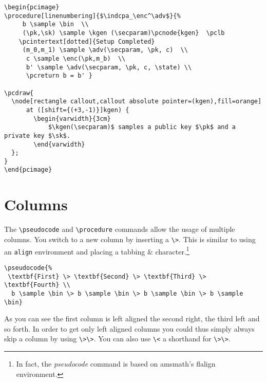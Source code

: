 \documentclass[a4paper]{report}
\begin{document}
\begin{lstlisting}
\begin{pcimage}
\procedure[linenumbering]{$\indcpa_\enc^\adv$}{%
	 b \sample \bin  \\
	 (\pk,\sk) \sample \kgen (\secparam)\pcnode{kgen}  \pclb
	\pcintertext[dotted]{Setup Completed} 
	 (m_0,m_1) \sample \adv(\secparam, \pk, c)  \\
	  c \sample \enc(\pk,m_b)  \\
	  b' \sample \adv(\secparam, \pk, c, \state) \\
	  \pcreturn b = b' }

\pcdraw{
  \node[rectangle callout,callout absolute pointer=(kgen),fill=orange]
      at ([shift={(+3,-1)}]kgen) {
		\begin{varwidth}{3cm}
			$\kgen(\secparam)$ samples a public key $\pk$ and a private key $\sk$.
		\end{varwidth}
  };
}
\end{pcimage}
\end{lstlisting}



\section{Columns}
The \lstinline$\pseudocode$ and \lstinline$\procedure$ commands allow the usage of multiple columns.
You switch to a new column by inserting a \lstinline$\>$. This is similar to using an \lstinline$align$
environment and placing a tabbing \& character.\footnote{In fact, the \emph{pseudocode} command
is based on amsmath's flalign environment.}
\begin{center}
\end{center}
\begin{lstlisting}
\pseudocode{%
 \textbf{First} \> \textbf{Second} \> \textbf{Third} \> \textbf{Fourth} \\
  b \sample \bin \> b \sample \bin \> b \sample \bin \> b \sample \bin}
\end{lstlisting}
As you can see the first column is left aligned the second right, the third left and so forth.
In order to get only left aligned columns you could thus simply always skip a column by
using \lstinline$\>\>$. You can also use \lstinline$\<$ a shorthand for \lstinline$\>\>$.
\begin{center}
\end{center}
\end{document}
